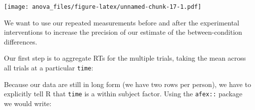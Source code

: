 \documentclass[]{article}
\newenvironment{Shaded}{\begin{snugshade}}{\end{snugshade}}
\newcommand{\CommentTok}[1]{\textcolor[rgb]{0.56,0.35,0.01}{\textit{#1}}}
\newcommand{\DataTypeTok}[1]{\textcolor[rgb]{0.13,0.29,0.53}{#1}}
\newcommand{\DecValTok}[1]{\textcolor[rgb]{0.00,0.00,0.81}{#1}}
\newcommand{\ErrorTok}[1]{\textcolor[rgb]{0.64,0.00,0.00}{\textbf{#1}}}
\newcommand{\FloatTok}[1]{\textcolor[rgb]{0.00,0.00,0.81}{#1}}
\newcommand{\KeywordTok}[1]{\textcolor[rgb]{0.13,0.29,0.53}{\textbf{#1}}}
\newcommand{\NormalTok}[1]{#1}
\newcommand{\OperatorTok}[1]{\textcolor[rgb]{0.81,0.36,0.00}{\textbf{#1}}}
\newcommand{\StringTok}[1]{\textcolor[rgb]{0.31,0.60,0.02}{#1}}
\begin{document}
\texttt{[image: anova\_files/figure-latex/unnamed-chunk-17-1.pdf]}

We want to use our repeated measurements before and after the experimental
interventions to increase the precision of our estimate of the between-condition
differences.

Our first step is to aggregate RTs for the multiple trials, taking the mean
across all trials at a particular \texttt{time}:

\begin{Shaded}
\end{Shaded}

Because our data are still in long form (we have two rows per person), we have
to explicitly tell R that \texttt{time} is a within subject factor. Using the \texttt{afex::}
package we would write:

\begin{Shaded}
\end{Shaded}
\end{document}
